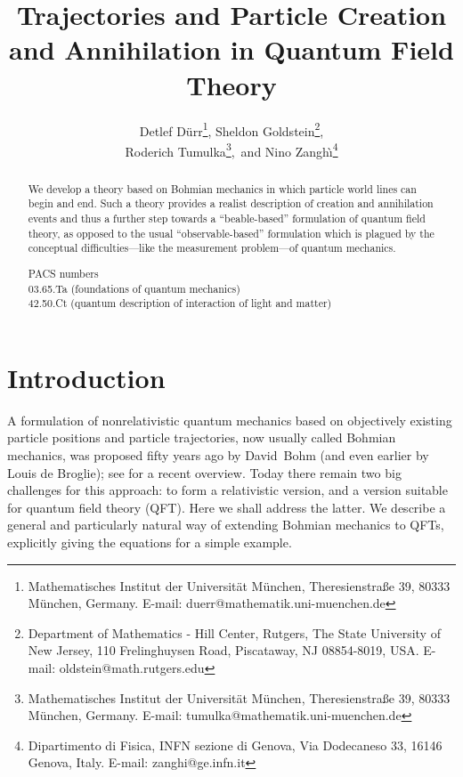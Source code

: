 \documentclass[12pt]{article}
\title{Trajectories and  Particle Creation and Annihilation in Quantum
Field Theory}
\author{
Detlef D\"urr\footnote{Mathematisches Institut der Universit\"{a}t 
	M\"{u}nchen, Theresienstra{\ss}e 39, 80333 M\"{u}nchen, Germany. 
	E-mail: duerr@mathematik.uni-muenchen.de},
Sheldon Goldstein\footnote{Department of Mathematics -
	Hill Center, Rutgers, The State University of New Jersey, 
	110 Frelinghuysen Road, Piscataway, NJ 08854-8019, USA.
	E-mail: oldstein@math.rutgers.edu},\\
Roderich Tumulka\footnote{Mathematisches Institut der Universit\"{a}t 
	M\"{u}nchen, Theresienstra{\ss}e 39, 80333 M\"{u}nchen, Germany. 
	E-mail: tumulka@mathematik.uni-muenchen.de},\ and
Nino Zangh\`\i\footnote{Dipartimento di Fisica, INFN sezione di Genova, 
	Via Dodecaneso 33, 16146 Genova, Italy. E-mail: zanghi@ge.infn.it}
}
\date{}
\begin{document}
\maketitle
\begin{abstract}
We develop a theory based on Bohmian mechanics in which particle world
lines can begin and end. Such a theory provides a realist description
of creation and annihilation events and thus a further step towards a
``beable-based'' formulation of quantum field theory, as opposed to
the usual ``observable-based'' formulation which is plagued by the
conceptual difficulties---like the measurement problem---of quantum
mechanics.
\bigskip

\noindent PACS numbers \\
	03.65.Ta (foundations of quantum mechanics)\\
	42.50.Ct (quantum description of interaction of light and matter)
\end{abstract}

\newcommand{\RRR}{\mathbb{R}} %
\newcommand{\CCC}{\mathbb{C}}
\newcommand{\SSS}{\mathbb{S}} %
\newcommand{\EEE}{\mathbb{E}}
\newcommand{\NNN}{\mathbb{N}}
\newcommand{\bo}{\mathrm{B}}%
\newcommand{\el}{\mathrm{F}} %
\newcommand{\inter}{\mathrm{int}} %
\newcommand{\profile}{\varphi} %
\newcommand{\hi}{${\cal H}$} %
\newcommand{\LL}{{\cal L}}
\newcommand{\Fock}{{\cal F}} %
\newcommand{\1}{\boldsymbol{1}} %
\newcommand{\vx}{\boldsymbol{x}}
\newcommand{\vk}{\boldsymbol k}
\newcommand{\vu}{\boldsymbol u}
\newcommand{\vy}{\boldsymbol y}
\newcommand{\vX}{\boldsymbol X}
\newcommand{\vY}{\boldsymbol Y}
\renewcommand{\Im}{\,\mathrm{Im}\,}
\renewcommand{\Re}{\,\mathrm{Re}\,}
\newcommand{\Laplace}{\Delta} %
\newcommand{\D}{d} %
\newcommand{\E}{e} %
\newcommand{\I}{\mathrm{i}} %


\section{Introduction}

A formulation of nonrelativistic quantum mechanics based on objectively
existing particle positions and particle trajectories, now usually called
Bohmian mechanics, was proposed fifty years ago by David~Bohm (and even
earlier by Louis de Broglie); see \cite{BM1} for a recent overview.  Today
there remain two big challenges for this approach: to form a relativistic
version, and a version suitable for quantum field theory (QFT). Here we
shall address the latter. We describe a general and particularly natural
way of extending Bohmian mechanics to QFTs, explicitly giving the equations
for a simple example.
\end{document}
